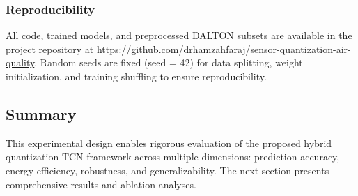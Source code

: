 \subsubsection{Reproducibility}
All code, trained models, and preprocessed DALTON subsets are available in the project repository at \url{https://github.com/drhamzahfaraj/sensor-quantization-air-quality}. Random seeds are fixed (seed = 42) for data splitting, weight initialization, and training shuffling to ensure reproducibility.

\subsection{Summary}

This experimental design enables rigorous evaluation of the proposed hybrid quantization-TCN framework across multiple dimensions: prediction accuracy, energy efficiency, robustness, and generalizability. The next section presents comprehensive results and ablation analyses.